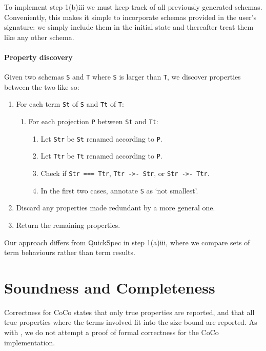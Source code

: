 To implement step 1(b)iii we must keep track of all previously
generated schemas.  Conveniently, this makes it simple to incorporate
schemas provided in the user's signature: we simply include them in
the initial state and thereafter treat them like any other schema.

\paragraph{Property discovery}
Given two schemas \verb|S| and \verb|T| where \verb|S| is larger than
\verb|T|, we discover properties between the two like so:

\begin{enumerate}
\item For each term \verb|St| of \verb|S| and \verb|Tt| of \verb|T|:
  \begin{enumerate}
  \item For each projection \verb|P| between \verb|St| and \verb|Tt|:
    \begin{enumerate}
    \item Let \verb|Str| be \verb|St| renamed according to \verb|P|.
    \item Let \verb|Ttr| be \verb|Tt| renamed according to \verb|P|.
    \item Check if \verb|Str === Ttr|, \verb|Ttr ->- Str|, or
      \verb|Str ->- Ttr|.
    \item In the first two cases, annotate \verb|S| as `not smallest'.
    \end{enumerate}
  \end{enumerate}
\item Discard any properties made redundant by a more general one.
\item Return the remaining properties.
\end{enumerate}

Our approach differs from QuickSpec\cite{claessen2010,smallbone2017}
in step 1(a)iii, where we compare sets of term behaviours rather than
term results.

\section{Soundness and Completeness}
\label{sec:coco-correctness}

Correctness for CoCo states that only true properties are reported,
and that all true properties where the terms involved fit into the
size bound are reported.  As with \dejafu{}, we do not attempt a proof
of formal correctness for the CoCo implementation.

